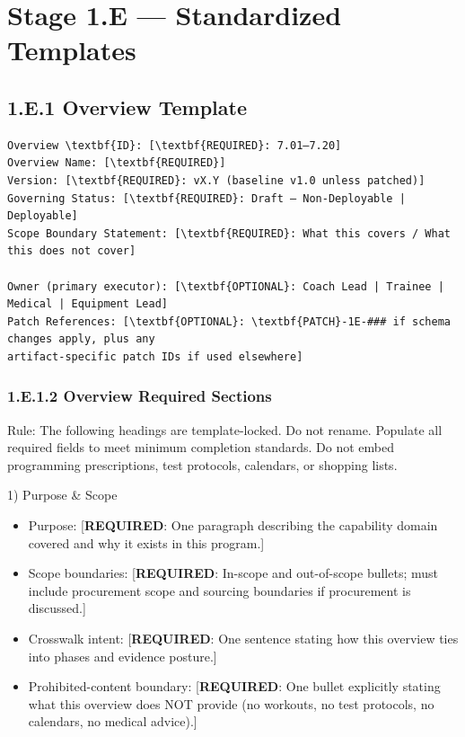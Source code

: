 \documentclass[10pt]{article}
\begin{document}
\section*{Stage 1.E — Standardized Templates}
{}

\subsection*{1.E.1 Overview Template}
{}

\begin{verbatim}
Overview \textbf{ID}: [\textbf{REQUIRED}: 7.01–7.20]
Overview Name: [\textbf{REQUIRED}]
Version: [\textbf{REQUIRED}: vX.Y (baseline v1.0 unless patched)]
Governing Status: [\textbf{REQUIRED}: Draft — Non-Deployable | Deployable]
Scope Boundary Statement: [\textbf{REQUIRED}: What this covers / What this does not cover]

Owner (primary executor): [\textbf{OPTIONAL}: Coach Lead | Trainee | Medical | Equipment Lead]
Patch References: [\textbf{OPTIONAL}: \textbf{PATCH}-1E-### if schema changes apply, plus any
artifact-specific patch IDs if used elsewhere]
\end{verbatim}

\subsubsection*{1.E.1.2 Overview Required Sections}

Rule: The following headings are template-locked. Do not rename. Populate all required fields to meet minimum completion standards. Do not embed programming prescriptions, test protocols, calendars, or shopping lists.

1) Purpose \& Scope

\begin{itemize}
\item Purpose: [\textbf{REQUIRED}: One paragraph describing the capability domain covered and why it exists in this program.]
\item Scope boundaries: [\textbf{REQUIRED}: In-scope and out-of-scope bullets; must include procurement scope and sourcing boundaries if procurement is discussed.]
\item Crosswalk intent: [\textbf{REQUIRED}: One sentence stating how this overview ties into phases and evidence posture.]
\item Prohibited-content boundary: [\textbf{REQUIRED}: One bullet explicitly stating what this overview does NOT provide (no workouts, no test protocols, no calendars, no medical advice).]
\end{itemize}
\end{document}
